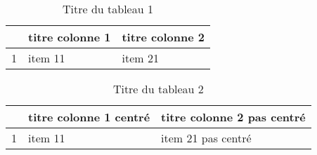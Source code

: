 \documentclass[12pt]{article}
\begin{document}
\begin{table}[!ht]
\begin{center}
\begin{tabularx}{\columnwidth}{|l|X|X|} %
 \hline
  & titre colonne 1 & titre colonne 2 \\
 \hline
 1  & item 11  & item 21  \\
\hline
\end{tabularx}
\caption{Titre du tableau 1}
\end{center}
\end{table}

\begin{table}[!ht]
\begin{center}
\begin{tabularx}{\columnwidth}{|X|>{\centering\arraybackslash}X|X|} %
 \hline
  & titre colonne 1 centré & titre colonne 2 \newline pas centré \\
 \hline
 1  & item 11  & item 21 pas centré  \\
\hline
\end{tabularx}
\caption{Titre du tableau 2}
\end{center}
\end{table}
\end{document}
